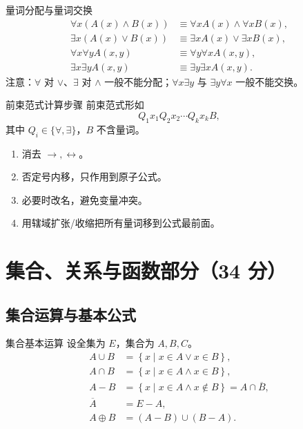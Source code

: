 \documentclass[UTF8,zihao=-4]{ctexart}
\newcommand{\set}[1]{\left\{#1\right\}}
\begin{document}
\begin{corebox}{量词分配与量词交换}
\begin{align*}
\forall x(A(x)\land B(x))&\equiv \forall xA(x)\land\forall xB(x),\\
\exists x(A(x)\lor B(x))&\equiv \exists xA(x)\lor\exists xB(x),\\
\forall x\forall y A(x,y)&\equiv\forall y\forall x A(x,y),\\
\exists x\exists y A(x,y)&\equiv\exists y\exists x A(x,y).
\end{align*}
注意：$\forall$ 对 $\lor$、$\exists$ 对 $\land$ 一般不能分配；$\forall x\exists y$ 与 $\exists y\forall x$ 一般不能交换。
\end{corebox}

\begin{methodbox}{前束范式计算步骤}
前束范式形如
\[
Q_1x_1Q_2x_2\cdots Q_kx_k B,
\]
其中 $Q_i\in\{\forall,\exists\}$，$B$ 不含量词。
\begin{enumerate}
  \item 消去 $\to,\leftrightarrow$。
  \item 否定号内移，只作用到原子公式。
  \item 必要时改名，避免变量冲突。
  \item 用辖域扩张/收缩把所有量词移到公式最前面。
\end{enumerate}
\end{methodbox}

\section{集合、关系与函数部分（34 分）}

\subsection{集合运算与基本公式}

\begin{corebox}{集合基本运算}
设全集为 $E$，集合为 $A,B,C$。
\[
\begin{aligned}
A\cup B&=\set{x\mid x\in A\lor x\in B},\\
A\cap B&=\set{x\mid x\in A\land x\in B},\\
A-B&=\set{x\mid x\in A\land x\notin B}=A\cap\overline B,\\
\overline A&=E-A,\\
A\oplus B&=(A-B)\cup(B-A).
\end{aligned}
\]
\end{corebox}
\end{document}

